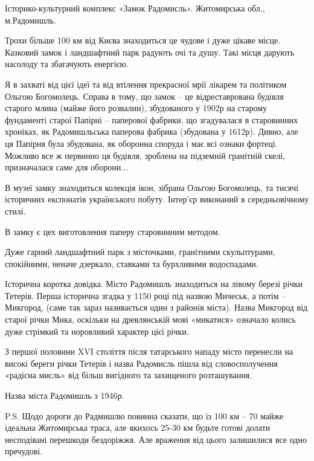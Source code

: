 Історико-культурний комплекс «Замок Радомисль». Житомирська обл., м.Радомишль.

Трохи більше 100 км від Києва знаходиться це чудове і дуже цікаве місце.
Казковий замок і ландшафтний парк радують очі та душу. Такі місця дарують
насолоду та збагачують енергією.


Я в захваті від цієї ідеї та від втілення прекрасної мрії лікарем та політиком
Ольгою Богомолець. Справа в тому, що замок – це відреставрована будівля старого
млина (майже його розвалин), збудованого у 1902р на старому фундаменті старої
Папірні – паперової фабрики, що згадувалася в старовинних хроніках, як
Радомишльська паперова фабрика (збудована у 1612р). Дивно, але ця Папірня була
збудована, як оборонна споруда і має всі ознаки фортеці. Можливо все ж первинно
ця будівля, зроблена на підземній гранітній скелі, призначалася саме для
оборони...

В музеї замку знаходиться колекція ікон, зібрана Ольгою Богомолець, та тисячі
історичних експонатів українського побуту. Інтер’єр виконаний в середньовічному
стилі. 

В замку є цех виготовлення паперу старовинним методом.

Дуже гарний ландшафтний парк з місточками, гранітними скульптурами, спокійними,
неначе дзеркало, ставками та бурхливими водоспадами.

Історична коротка довідка. Місто Радомишль знаходиться на лівому березі річки
Тетерів. Перша історична згадка у 1150 році під назвою Мичеськ, а потім –
Микгород, (саме так зараз називається один з районів міста). Назва Микгород від
старої річки Мика, оскільки на древлянській мові «микатися» означало колись
дуже стрімкий та норовливий характер цієї річки. 

З першої половини XVI століття після татарського нападу місто перенесли на
високі береги річки Тетерів і назва Радомисль пішла від словосполучення
«радісна мисль» від більш вигідного та захищеного розташування.

Назва міста Радомишль з 1946р.

P.S. Щодо дороги до Радмишлю повинна сказати, що із 100 км – 70 майже ідеальна
Житомирська траса, але якихось 25-30 км будьте готові долати несподівані
перешкоди бездоріжжя. Але враження від цього залишилися все одно пречудові.
